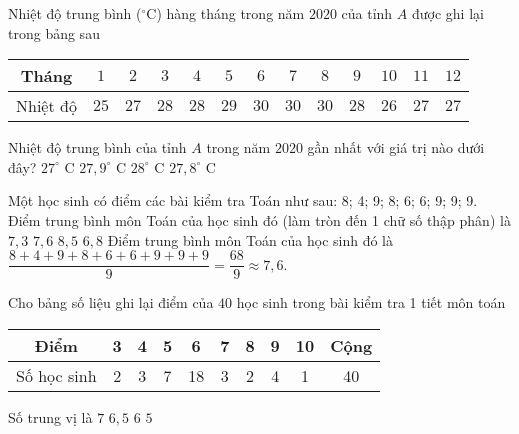 \begin{ex}%
	Nhiệt độ trung bình (${}^{\circ}$C) hàng tháng trong năm $2020$ của tỉnh $A$ được ghi lại trong bảng sau
	\begin{center}
		\begin{tabular}{|c|c|c|c|c|c|c|c|c|c|c|c|c|}
			\hline
			Tháng&$1$&$2$&$3$&$4$&$5$&$6$&$7$&$8$&$9$&$10$&$11$&$12$\\
			\hline
			Nhiệt độ&$25$&$27$&$28$&$28$&$29$&$30$&$30$&$30$&$28$&$26$&$27$&$27$\\
			\hline
		\end{tabular}
	\end{center}
	Nhiệt độ trung bình của tỉnh $A$ trong năm $2020$ gần nhất với giá trị nào dưới đây?
	\choice
	{$27^{\circ}$ C}
	{\True $27{,}9^{\circ}$ C}
	{$28^{\circ}$ C}
	{$27{,}8^{\circ}$ C}
\end{ex}

\begin{ex}%
		Một học sinh có điểm các bài kiểm tra Toán như sau: 8; 4; 9; 8; 6; 6; 9; 9; 9. Điểm trung bình môn Toán của học sinh đó (làm tròn đến 1 chữ số thập phân) là
		\choice
		{$ 7{,}3 $}
		{\True $ 7{,}6 $}
		{$ 8{,}5 $}
		{$ 6{,}8 $}
		\loigiai
		{Điểm trung bình môn Toán của học sinh đó là $ \dfrac{8+4+9+8+6+6+9+9+9}{9}=\dfrac{68}{9} \approx 7{,}6 $.
		}
	\end{ex}

\begin{ex}%
	Cho bảng số liệu ghi lại điểm của $ 40 $ học sinh trong bài kiểm tra 1 tiết môn toán
	\begin{center}
		\begin{tabular}{|c|c|c|c|c|c|c|c|c|c|}
			\hline
			Điểm & 3 & 4 & 5 & 6 & 7 & 8 & 9 & 10 & Cộng  \\
			\hline
			Số học sinh & 2 & 3 & 7 & 18 & 3 & 2 & 4 & 1 & 40 \\
			\hline
		\end{tabular}
	\end{center}
	Số trung vị là
	\choice
	{$7$}
	{$6{, }5$}
	{\True $6$}
	{$5$}
\end{ex}

